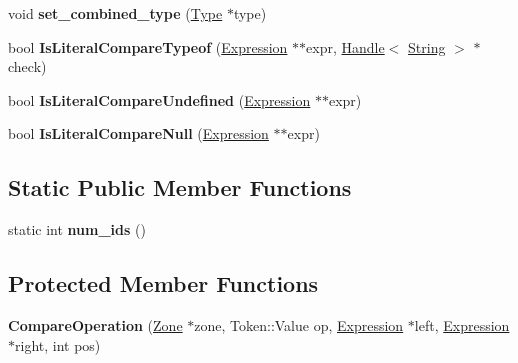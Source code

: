 \begin{DoxyCompactItemize}
\item 
void {\bfseries set\+\_\+combined\+\_\+type} (\hyperlink{classv8_1_1internal_1_1_type}{Type} $\ast$type)\hypertarget{classv8_1_1internal_1_1_compare_operation_af2bc1927343e18967b0f75dcd718aa37}{}\label{classv8_1_1internal_1_1_compare_operation_af2bc1927343e18967b0f75dcd718aa37}

\item 
bool {\bfseries Is\+Literal\+Compare\+Typeof} (\hyperlink{classv8_1_1internal_1_1_expression}{Expression} $\ast$$\ast$expr, \hyperlink{classv8_1_1internal_1_1_handle}{Handle}$<$ \hyperlink{classv8_1_1internal_1_1_string}{String} $>$ $\ast$check)\hypertarget{classv8_1_1internal_1_1_compare_operation_a76b8d6ce4ea8430ab050e7e0fe8110fb}{}\label{classv8_1_1internal_1_1_compare_operation_a76b8d6ce4ea8430ab050e7e0fe8110fb}

\item 
bool {\bfseries Is\+Literal\+Compare\+Undefined} (\hyperlink{classv8_1_1internal_1_1_expression}{Expression} $\ast$$\ast$expr)\hypertarget{classv8_1_1internal_1_1_compare_operation_aab66b8096d3e5be49701799ac650529d}{}\label{classv8_1_1internal_1_1_compare_operation_aab66b8096d3e5be49701799ac650529d}

\item 
bool {\bfseries Is\+Literal\+Compare\+Null} (\hyperlink{classv8_1_1internal_1_1_expression}{Expression} $\ast$$\ast$expr)\hypertarget{classv8_1_1internal_1_1_compare_operation_aade6a47a782271dad8a9eca9dc89dc82}{}\label{classv8_1_1internal_1_1_compare_operation_aade6a47a782271dad8a9eca9dc89dc82}

\end{DoxyCompactItemize}
\subsection*{Static Public Member Functions}
\begin{DoxyCompactItemize}
\item 
static int {\bfseries num\+\_\+ids} ()\hypertarget{classv8_1_1internal_1_1_compare_operation_ab094f7fe30e6d0325b6ad9eafdfa2d3d}{}\label{classv8_1_1internal_1_1_compare_operation_ab094f7fe30e6d0325b6ad9eafdfa2d3d}

\end{DoxyCompactItemize}
\subsection*{Protected Member Functions}
\begin{DoxyCompactItemize}
\item 
{\bfseries Compare\+Operation} (\hyperlink{classv8_1_1internal_1_1_zone}{Zone} $\ast$zone, Token\+::\+Value op, \hyperlink{classv8_1_1internal_1_1_expression}{Expression} $\ast$left, \hyperlink{classv8_1_1internal_1_1_expression}{Expression} $\ast$right, int pos)\hypertarget{classv8_1_1internal_1_1_compare_operation_a63af97f7d497519c2db012adede33ef7}{}\label{classv8_1_1internal_1_1_compare_operation_a63af97f7d497519c2db012adede33ef7}

\end{DoxyCompactItemize}
